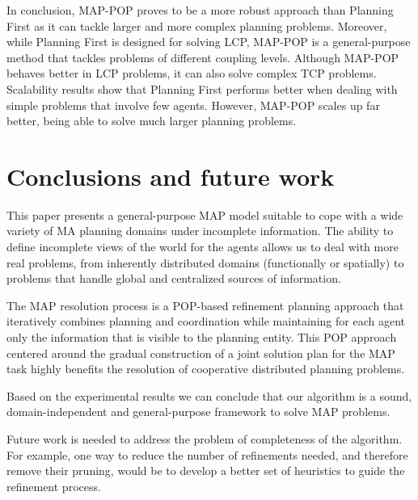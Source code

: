 \documentclass[12pt]{article}
\begin{document}
In conclusion, MAP-POP proves to be a more robust approach than Planning First
as it can tackle larger and more complex planning problems.
Moreover, while Planning First is designed for solving LCP,
MAP-POP is a general-purpose method that tackles problems of different coupling levels.
Although MAP-POP behaves better in LCP problems, it can also solve complex TCP problems.
Scalability results show that Planning First performs better when dealing with simple problems
that involve few agents.
However, MAP-POP scales up far better, being able to solve much larger planning problems.

\section{Conclusions and future work}

This paper presents a general-purpose MAP model suitable to cope with a wide variety of MA planning domains under incomplete information.
The ability to define incomplete views of the world for the agents allows us to deal with more real problems, from inherently distributed domains (functionally or spatially) to problems that handle global and centralized sources of information.

The MAP resolution process is a POP-based refinement planning approach that iteratively combines planning and coordination while maintaining for each agent only the information that is visible to the planning entity.
This POP approach centered around the gradual construction of a joint solution plan for the MAP task highly benefits the resolution of cooperative distributed planning problems.

Based on the experimental results we can conclude that our algorithm is a sound, domain-independent and general-purpose framework to solve MAP problems.

Future work is needed to address the problem of completeness of the algorithm.
For example, one way to reduce the number of refinements needed, and therefore remove their pruning,
would be to develop a better set of heuristics to guide the refinement process.

\newpage
\printbibliography
\end{document}

